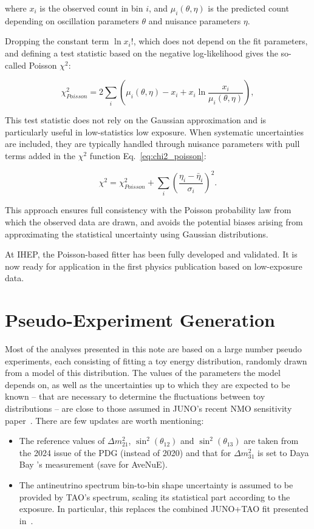 where $x_i$ is the observed count in bin $i$, and $\mu_i(\theta, \eta)$ is the predicted count depending on oscillation parameters $\theta$ and nuisance parameters $\eta$.

Dropping the constant term $\ln x_i!$, which does not depend on the fit parameters, and defining a test statistic based on the negative log-likelihood gives the so-called Poisson $\chi^2$:

\begin{equation}  
\chi^2_{Poisson} = 2 \sum_{i} \left( \mu_i(\theta, \eta) - x_i + x_i \ln \frac{x_i}{\mu_i(\theta, \eta)} \right),  
\label{eq:chi2_poisson}  
\end{equation}

This test statistic does not rely on the Gaussian approximation and is particularly useful in low-statistics low exposure. When systematic uncertainties are included, they are typically handled through nuisance parameters with pull terms added in the $\chi^2$ function Eq.~\ref{eq:chi2_poisson}:

\begin{equation}  
\chi^2 = \chi^2_{Poisson} + \sum_{i}\left(\frac{\eta_{i}-\bar{\eta}_i}{\sigma_{i}}\right)^2.  
\end{equation}

This approach ensures full consistency with the Poisson probability law from which the observed data are drawn, and avoids the potential biases arising from approximating the statistical uncertainty using Gaussian distributions.

At IHEP, the Poisson-based fitter has been fully developed and validated. It is now ready for application in the first physics publication based on low-exposure data.

\section{Pseudo-Experiment Generation}\label{appendix:pseudoexp}

Most of the analyses presented in this note are based on a large number pseudo experiments, each consisting of fitting a toy energy distribution, randomly drawn from a model of this distribution. The values of the parameters the model depends on, as well as the uncertainties up to which they are expected to be known -- that are necessary to determine the fluctuations between toy distributions -- are close to those assumed in JUNO’s recent NMO sensitivity paper~\cite{JUNO:2024jaw}. There are few updates are worth mentioning: 
\begin{itemize}
    \item The reference values of $\Delta m^2_{21}$, $\sin^2(\theta_{12})$ and $\sin^2(\theta_{13})$ are taken from the 2024 issue of the PDG (instead of 2020) and that for $\Delta m^2_{31}$ is set to Daya Bay 's measurement (save for AveNuE). 
    \item  The antineutrino spectrum bin-to-bin shape uncertainty is assumed to be provided by TAO's spectrum,  scaling its statistical part according to the exposure. In particular, this replaces the combined JUNO+TAO fit presented in~\cite{JUNO:2024jaw}. 
\end{itemize}

